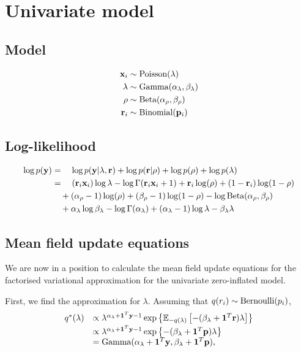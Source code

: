 \documentclass{amsart}[12pt]
\begin{document}
\section{Univariate model} 

\subsection{Model}
\begin{align*}
	{\bf x}_i   & \sim \text{Poisson}(\lambda)                    \\
	\lambda & \sim \text{Gamma}(\alpha_\lambda,\beta_\lambda) \\
	\rho    & \sim \text{Beta}(\alpha_\rho, \beta_\rho)       \\
	{\bf r}_i   & \sim \text{Binomial}({\bf p}_i)                     
\end{align*}

\subsection{Log-likelihood}
\begin{align*}
\log p({\bf y}) &= \quad \log p({\bf y} | \lambda, {\bf r}) + \log p({\bf r} | \rho) + \log p(\rho) + \log p(\lambda) \\
&= \quad ({\bf r}_i {\bf x}_i) \log \lambda - \log \Gamma({\bf r}_i {\bf x}_i + 1) + {\bf r}_i \log(\rho) + (1 - {\bf r}_i) \log(1 - \rho) \\
& \quad + (\alpha_\rho - 1) \log (\rho) + (\beta_\rho - 1) \log(1 - \rho) - \log \text{Beta} (\alpha_\rho, \beta_\rho) \\
& \quad + \alpha_\lambda \log \beta_\lambda - \log \Gamma(\alpha_\lambda) + (\alpha_\lambda - 1) \log \lambda - \beta_\lambda \lambda
\end{align*}

\subsection{Mean field update equations}
We are now in a position to calculate the mean field update equations for the factorised
variational approximation for the univariate zero-inflated model.

First, we find the approximation for $\lambda$. Assuming that $q(r_i) \sim \text{Bernoulli} (p_i)$,
\[
\begin{array}{rl}
	q^*(\lambda)
	  & \propto                                                            
	\lambda^{\alpha_\lambda+{\bf 1}^T{\bf y} - 1} 
	\exp\left\{ 
	{\mathbb E}_{-q(\lambda)} \left[
	-(\beta_\lambda + {\bf 1}^T{\bf r}) \lambda 
	\right] 
	\right\} 
	\\ [0.5ex]
	  &                                                                    
	\propto \lambda^{\alpha_\lambda+{\bf 1}^T{\bf y} - 1} \exp{\left \{-(\beta_\lambda + {\bf1}^T{\bf p})\lambda \right \} } 
	\\
	  & = \text{Gamma} (\alpha_\lambda+{\bf 1}^T{\bf y}, \beta_\lambda+{\bf 1}^T{\bf p}), 
\end{array}
\]
\end{document}
